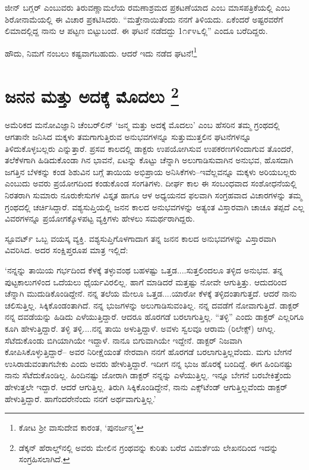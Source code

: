 ಜೀನ್ ಬಗ್ಲರ್ ಎಂಬುವರು ತಿರುವಣ್ಣಾಮಲೆಯ ರಮಣಾಶ್ರಮದ ಪ್ರಕಟಣೆಯಾದ ಎಂಬ ಮಾಸಪತ್ರಿಕೆಯಲ್ಲಿ  ಎಂಬ ಶಿರೋನಾಮೆಯಲ್ಲಿ ಈ ವಿಚಾರ ಪ್ರಕಟಿಸಿದರು. “ಮತ್ತೇನಾಯಿತೆಂದು ನನಗೆ ತಿಳಿಯದು. ಏಕೆಂದರೆ ಅಷ್ಟರವರೆಗೆ ಲಿಮಾದಲ್ಲಿದ್ದ ನಾನು ಆ ಪಟ್ಟಣ ಬಿಟ್ಟುಬಂದೆ. ಈ ಘಟನೆ ನಡೆದದ್ದು 1೧೯೪೬ಲ್ಲಿ” ಎಂದೂ ಬರೆದಿದ್ದರು.

ಹೌದು, ನಿಮಗೆ ನಂಬಲು ಕಷ್ಟವಾಗಬಹುದು. ಆದರೆ ಇದು ನಡೆದ ಘಟನೆ!\footnote{ ಕೋಟ ಶ‍್ರೀ ವಾಸುದೇವ ಕಾರಂತ, ‘ಪುನರ್ಜನ್ಮ’}


\section{ಜನನ ಮತ್ತು ಅದಕ್ಕೆ ಮೊದಲು \protect\footnote{ ಡೆಕ್ಕನ್ ಹೆರಾಲ್ಡ್​ನಲ್ಲಿ  ಅವರು ಮೇಲಿನ ಗ್ರಂಥವನ್ನು ಕುರಿತು ಬರೆದ ವಿಮರ್ಶೆಯ ಲೇಖನದಿಂದ ಇದನ್ನು ಸಂಗ್ರಹಿಸಲಾಗಿದೆ.}}

ಅಮೆರಿಕದ ಮನೋವಿಜ್ಞಾನಿ ಚೆಂಬರ್​ಲಿನ್ ‘ಜನ್ಮ ಮತ್ತು ಅದಕ್ಕೆ ಮೊದಲು’ ಎಂಬ ಹೆಸರಿನ ತಮ್ಮ ಗ್ರಂಥದಲ್ಲಿ ಆಗತಾನೇ ಜನಿಸಿದ ಮಕ್ಕಳು ತಮಗಾಗುತ್ತಿರುವ ಅನುಭವಗಳನ್ನೂ ಸುತ್ತುಮುತ್ತಲಿನ ಘಟನೆಗಳನ್ನೂ ತಿಳಿದುಕೊಳ್ಳಬಲ್ಲರು ಎನ್ನುತ್ತಾರೆ. ಪ್ರಸವ ಕಾಲದಲ್ಲಿ ಡಾಕ್ಟರು ಉಪಯೋಗಿಸುವ ಉಪಕರಣಗಳಿಂದಾಗುವ ತೊಂದರೆ, ತಲೆಕೆಳಗಾಗಿ ಹಿಡಿದುಕೊಂಡಾ ಗಿನ ಭಾವನೆ, ಏಟನ್ನು ಕೊಟ್ಟು ಚೆನ್ನಾಗಿ ಅಲುಗಾಡಿಸುವಾಗಿನ ಅನುಭವ, ಹೊಸದಾಗಿ ಜಗತ್ತಿನ ಬೆಳಕನ್ನು ಕಂಡ ಶಿಶುವಿನ ಬಗ್ಗೆ ತಾಯಿಯ ಅಭಿಪ್ರಾಯ ಅನಿಸಿಕೆಗಳು–ಇವೆಲ್ಲವನ್ನೂ ಮಕ್ಕಳು ಅರಿಯಬಲ್ಲರು ಎಂಬುದು ಅವರು ಪ್ರಯೋಗದಿಂದ ಕಂಡುಕೊಂಡ ಸಂಗತಿಗಳು. ದೀರ್ಘ ಕಾಲ ಈ ಸಂಬಂಧವಾದ ಸಂಶೋಧನೆಯಲ್ಲಿ ನಿರತರಾಗಿ ಸುಮಾರು ನೂರುಕೇಸುಗಳ ವಿಸ್ತೃತ ಹಾಗೂ ಆಳ ಅಧ್ಯಯನದ ಫಲವಾಗಿ ಸಂಗ್ರಹವಾದ ವಿಚಾರಗಳನ್ನು ತಮ್ಮ ಗ್ರಂಥದಲ್ಲಿ ಚರ್ಚಿಸಿದ್ದಾರೆ. ವಶ್ಯಸುಪ್ತಿಯಲ್ಲಿ ಜನನ ಕಾಲದ ಅನುಭವಗಳನ್ನು ಅತ್ಯಂತ ವಿಸ್ತಾರವಾಗಿ ಚಾಚೂ ತಪ್ಪದೆ ಎಲ್ಲ ವಿವರಗಳನ್ನೂ ಪ್ರಯೋಗಕ್ಕೊಳಪಟ್ಟ ವ್ಯಕ್ತಿಗಳು ಹೇಳಲು ಸಮರ್ಥರಾಗಿದ್ದರು.

ಸ್ಟೂವರ್ಟ್ ಒಬ್ಬ ವಯಸ್ಕ ವ್ಯಕ್ತಿ. ವಶ್ಯಸುಪ್ತಿಗೊಳಗಾದಾಗ ತನ್ನ ಜನನ ಕಾಲದ ಅನುಭವಗಳನ್ನು ವಿಸ್ತಾರವಾಗಿ ವಿವರಿಸಿದ. ಅದರ ಸಂಕ್ಷಿಪ್ತರೂಪ ಮಾತ್ರ ಇಲ್ಲಿದೆ:

‘ನನ್ನನ್ನು ತಾಯಿಯ ಗರ್ಭದಿಂದ ಕೆಳಕ್ಕೆ ತಳ್ಳುವಂಥ ಬಹಳಷ್ಟು ಒತ್ತಡ....ಸುತ್ತಲಿಂದಲೂ ತಳ್ಳಿದ ಅನುಭವ. ತನ್ನ ಪುಟ್ಟಕಾಲುಗಳಿಂದ ಒದೆಯಲು ಧೈರ್ಯವಿರಲಿಲ್ಲ. ಹಾಗೆ ಮಾಡಿದರೆ ಮತ್ತಷ್ಟು ನೋವೇ ಆಗುತ್ತಿತ್ತು. ಆದುದರಿಂದ ಚೆನ್ನಾಗಿ ಮುದುಡಿಕೊಂಡಿದ್ದೇನೆ. ನನ್ನ ತಲೆಯ ಮೇಲೂ ಒತ್ತಡ....ಯಾರೋ ಕೆಳಕ್ಕೆ ತಳ್ಳಿದಂತಾಗುತ್ತದೆ. ಆದರೆ ನಾನು ಚಲಿಸುತ್ತಿಲ್ಲ. ಸಿಕ್ಕಿಕೊಂಡಂತಾಗಿದೆ. ನನ್ನ ಭುಜಗಳನ್ನು ಅಲುಗಾಡಿಸುವಂತಿಲ್ಲ. ನನ್ನ ದವಡೆಗೆ ನೋವಾಗುತ್ತಿದೆ. ಡಾಕ್ಟರ್ ನನ್ನ ದವಡೆಯನ್ನು ಹಿಡಿದು ಎಳೆಯುತ್ತಿದ್ದಾರೆ. ಆದರೂ ಹೊರಗಡೆ ಬರಲಾಗುತ್ತಿಲ್ಲ. “ತಳ್ಳಿ” ಎಂದು ಡಾಕ್ಟರ್ ಎಲ್ಲರಿಗೂ ಕೂಗಿ ಹೇಳುತ್ತಿದ್ದಾರೆ. ತಳ್ಳಿ ತಳ್ಳಿ....ನನ್ನ ತಾಯಿ ಅಳುತ್ತಿದ್ದಾಳೆ. ಅವಳು ಸ್ವಲವೂ ಆರಾಮ (ರಿಲೇಕ್ಸ್​) ಆಗಿಲ್ಲ. ಸೆಟೆದುಕೊಂಡು ಬಿಗಿಯಾಗಿಯೇ ಇದ್ದಾಳೆ. ನಾನೂ ಬಿಗುವಾಗಿಯೇ ಇದ್ದೇನೆ. ಡಾಕ್ಟರ್ ನಿಜವಾಗಿ ಕೋಪಿಸಿಕೊಳ್ಳುತ್ತಿದ್ದಾರೆ– ಅವರ ನಿರೀಕ್ಷೆಯಂತೆ ನೇರವಾಗಿ ನನಗೆ ಹೊರಗಡೆ ಬರಲಾಗುತ್ತಿಲ್ಲವೆಂದು. ಮಗು ಬೇಗನೆ ಉಸಿರಾಡುವಂತಾಗಬೇಕು ಎಂದು ಅವರು ಹೇಳುತ್ತಿದ್ದಾರೆ. ಇದೀಗ ನನ್ನ ಭುಜ ಹೊರಕ್ಕೆ ಬಂದಿದ್ದೆ. ಈಗ ಹಿಂದಿನಷ್ಟು ನಾನು ಸೆಟೆದುಕೊಂಡಿಲ್ಲ. ಹಿಂದಿನಷ್ಟು ಜೋರಾಗಿ ಡಾಕ್ಟರ್ ನನ್ನನ್ನು ಎಳೆಯುತ್ತಿಲ್ಲ. ಇನ್ನೂ ಬೇಗನೆ ಬರಬೇಕಿತ್ತೆಂದು ಹೇಳುತ್ತಲೇ ಇದ್ದಾರೆ. ಆದರೆ ಆಗುತ್ತಿಲ್ಲ. ತಿರುಗಿ ಸಿಕ್ಕಿಕೊಂಡಿದ್ದೇನೆ, ನಾನು ಎಕ್ಸ್​ಟೆಂಡ್ ಆಗುತ್ತಿಲ್ಲವೆಂದು ಡಾಕ್ಟರ್ ಹೇಳುತ್ತಿದ್ದಾರೆ. ಹಾಗೆಂದರೇನೆಂದು ನನಗೆ ಅರ್ಥವಾಗುತ್ತಿಲ್ಲ.’

